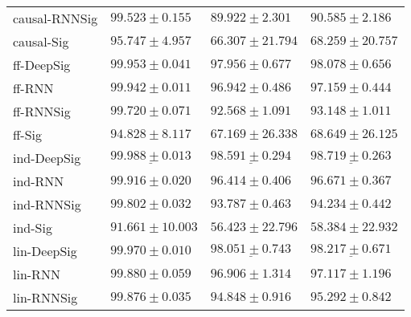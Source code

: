\begin{tabular}{llll}
causal-RNNSig  &                           $ 99.523 \pm 0.155 $ &                           $ 89.922 \pm 2.301 $ &                           $ 90.585 \pm 2.186 $ \\
causal-Sig     &                           $ 95.747 \pm 4.957 $ &                          $ 66.307 \pm 21.794 $ &                          $ 68.259 \pm 20.757 $ \\
ff-DeepSig     &                           $ 99.953 \pm 0.041 $ &                           $ 97.956 \pm 0.677 $ &                           $ 98.078 \pm 0.656 $ \\
ff-RNN         &                           $ 99.942 \pm 0.011 $ &                           $ 96.942 \pm 0.486 $ &                           $ 97.159 \pm 0.444 $ \\
ff-RNNSig      &                           $ 99.720 \pm 0.071 $ &                           $ 92.568 \pm 1.091 $ &                           $ 93.148 \pm 1.011 $ \\
ff-Sig         &                           $ 94.828 \pm 8.117 $ &                          $ 67.169 \pm 26.338 $ &                          $ 68.649 \pm 26.125 $ \\
ind-DeepSig    &  $  \mathbf{ \underline{ 99.988 \pm 0.013 }} $ &  $  \mathbf{ \underline{ 98.591 \pm 0.294 }} $ &  $  \mathbf{ \underline{ 98.719 \pm 0.263 }} $ \\
ind-RNN        &                           $ 99.916 \pm 0.020 $ &                           $ 96.414 \pm 0.406 $ &                           $ 96.671 \pm 0.367 $ \\
ind-RNNSig     &                           $ 99.802 \pm 0.032 $ &                           $ 93.787 \pm 0.463 $ &                           $ 94.234 \pm 0.442 $ \\
ind-Sig        &                          $ 91.661 \pm 10.003 $ &                          $ 56.423 \pm 22.796 $ &                          $ 58.384 \pm 22.932 $ \\
lin-DeepSig    &                           $ 99.970 \pm 0.010 $ &            $  \underline{ 98.051 \pm 0.743 } $ &            $  \underline{ 98.217 \pm 0.671 } $ \\
lin-RNN        &                           $ 99.880 \pm 0.059 $ &                           $ 96.906 \pm 1.314 $ &                           $ 97.117 \pm 1.196 $ \\
lin-RNNSig     &                           $ 99.876 \pm 0.035 $ &                           $ 94.848 \pm 0.916 $ &                           $ 95.292 \pm 0.842 $ \\

\end{tabular}
